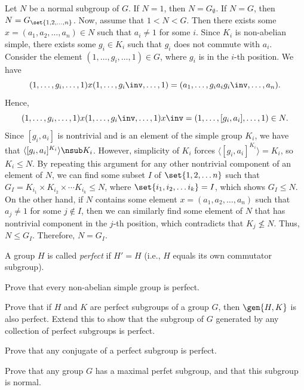 \begin{sol}
    Let $N$ be a normal subgroup of $G$. If $N = 1$, then $N = G_\emptyset$. If $N = G$, then $N = G_{\set{1, 2, \ldots, n}}$. Now, assume that $1 < N < G$. Then there exists some $x = (a_1, a_2, \ldots, a_n) \in N$ such that $a_i \neq 1$ for some $i$. Since $K_i$ is non-abelian simple, there exists some $g_i \in K_i$ such that $g_i$ does not commute with $a_i$. Consider the element $(1, \ldots, g_i, \ldots, 1) \in G$, where $g_i$ is in the $i$-th position. We have
    \[(1, \ldots, g_i, \ldots, 1) x (1, \ldots, g_i\inv, \ldots, 1) = (a_1, \ldots, g_i a_i g_i\inv, \ldots, a_n).\]
    Hence,
    \[(1, \ldots, g_i, \ldots, 1) x (1, \ldots, g_i\inv, \ldots, 1) x\inv = (1, \ldots, [g_i, a_i], \ldots, 1) \in N.\]
    Since $[g_i, a_i]$ is nontrivial and is an element of the simple group $K_i$, we have that $\langle [g_i, a_i]^{K_i} \rangle \nsub K_i$. However, simplicity of $K_i$ forces $\langle [g_i, a_i]^{K_i} \rangle = K_i$, so $K_i \leq N$. By repeating this argument for any other nontrivial component of an element of $N$, we can find some subset $I$ of $\set{1, 2, \ldots n}$ such that $G_I = K_{i_1} \times K_{i_2} \times \cdots K_{i_k} \leq N$, where $\set{i_1, i_2, \ldots i_k} = I$, which shows $G_I \leq N$. On the other hand, if $N$ contains some element $x = (a_1, a_2, \ldots, a_n)$ such that $a_j \neq 1$ for some $j \notin I$, then we can similarly find some element of $N$ that has nontrivial component in the $j$-th position, which contradicts that $K_j \not\leq N$. Thus, $N \leq G_I$. Therefore, $N = G_I$.
\end{sol}

\begin{exercise}\label{ex5.4.19}
    A group $H$ is called \textit{perfect} if $H' = H$ (i.e., $H$ equals its own commutator subgroup).
    \begin{subproblems}
        \item Prove that every non-abelian simple group is perfect.
        \item Prove that if $H$ and $K$ are perfect subgroups of a group $G$, then $\gen{H, K}$ is also perfect. Extend this to show that the subgroup of $G$ generated by any collection of perfect subgroups is perfect.
        \item Prove that any conjugate of a perfect subgroup is perfect.
        \item Prove that any group $G$ has a maximal perfet subgroup, and that this subgroup is normal.
    \end{subproblems}
\end{exercise}

